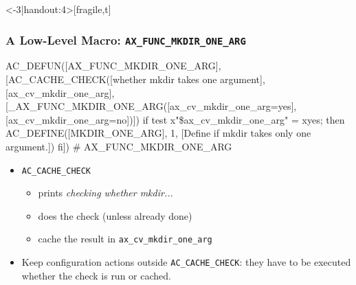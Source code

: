 \documentclass{beamer}
\begin{document}
\begin{frame}<-3|handout:4>[fragile,t]
\frametitle{A Low-Level Macro: \texttt{AX\_FUNC\_MKDIR\_ONE\_ARG}}
\vspace*{-1em}
\begin{block}{}
\begin{semiverbatim}
AC_DEFUN([AX_FUNC_MKDIR_ONE_ARG],
[\alert<2,4>{AC_CACHE_CHECK([whether mkdir takes one argument],
                [ax_cv_mkdir_one_arg],
[_AX_FUNC_MKDIR_ONE_ARG([ax_cv_mkdir_one_arg=yes],
                        [ax_cv_mkdir_one_arg=no])])}
\alert<all:3>{if test x"\$ax_cv_mkdir_one_arg" = xyes; then
  AC_DEFINE([MKDIR_ONE_ARG], 1,
            [Define if mkdir takes only one argument.])
fi}]) # AX_FUNC_MKDIR_ONE_ARG
\end{semiverbatim}
\end{block}

\begin{itemize}
\item<2-> \texttt{AC\_CACHE\_CHECK}
\begin{itemize}
\item prints \emph{checking whether mkdir...}
\item does the check (unless already done)
\item cache the result in \texttt{ax\_cv\_mkdir\_one\_arg}
\end{itemize}
\item<3-> Keep configuration actions outside
  \texttt{AC\_CACHE\_CHECK}: they have to be executed
  whether the check is run or cached.
\end{itemize}

\end{frame}
\end{document}
